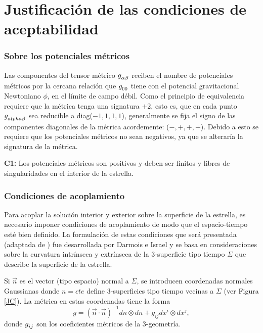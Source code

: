 \chapter{Justificación de las condiciones de aceptabilidad}\label{AceppCon}

\subsection*{Sobre los potenciales métricos}
Las componentes del tensor métrico $\tensor{g}{_\alpha_\beta}$ reciben el nombre de potenciales métricos por la cercana relación que $\tensor{g}{_0_0}$ tiene con el potencial gravitacional Newtoniano $\phi$, en el límite de campo débil. Como el principio de equivalencia requiere que la métrica tenga una signatura $+2$, esto es, que en cada punto $\tensor{g}{_{alpha}_{\beta}}$ sea reducible a diag($-1,1,1,1$), generalmente se fija el signo de las componentes diagonales de la métrica acordemente: ($-, +, +, +$). Debido a esto se requiere que los potenciales métricos no sean negativos, ya que se alteraría la signatura de la métrica.

\textbf{C1:} Los potenciales métricos son positivos y deben ser finitos y libres de singularidades en el interior de la estrella.
\subsection*{Condiciones de acoplamiento}
 Para acoplar la solución interior y exterior sobre la superficie de la estrella, es necesario imponer condiciones de acoplamiento de modo que el espacio-tiempo esté bien definido. 
 La formulación de estas condiciones que será presentada (adaptada de \cite{Misner1973}) fue desarrollada por Darmois \cite{Darmois1927} e Israel \cite{Israel1966} y se basa en consideraciones sobre la curvatura intrínseca y extrínseca de la 3-superficie tipo tiempo $\Sigma$ que describe la superficie de la estrella.
 
 Si $\vec{n}$ es el vector (tipo espacio) normal a $\Sigma$, se introducen coordenadas normales Gaussianas donde $n=cte$ define 3-superficies tipo tiempo vecinas a $\Sigma$ (ver Figura \ref{JC}). La métrica en estas coordenadas tiene la forma 
 \begin{equation}
g=(\vec{n} \cdot \vec{n})^{-1} d n\otimes d n +g_{i j} d x^{i} \otimes d x^{j},
\end{equation}
donde $\tensor{g}{_i_j}$ son los coeficientes métricos de la 3-geometría.  

